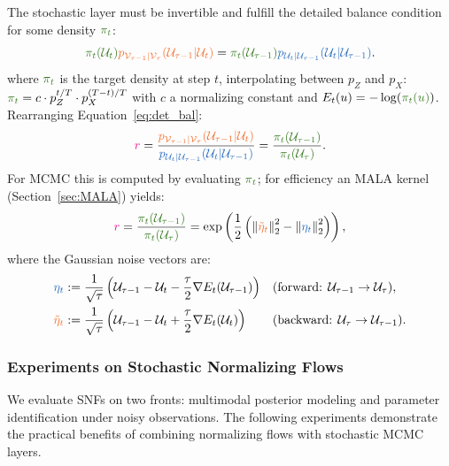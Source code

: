 The stochastic layer must be invertible and fulfill the detailed balance condition for some density $\textcolor{OliveGreen}{\pi_t}$:
\begin{equation}
    \label{eq:det_bal}
    \textcolor{OliveGreen}{\pi_t(\mathcal{U}_t)}\textcolor{Orange}{p_{\mathcal{V}_{\tau-1}|\mathcal{V}_\tau}(\mathcal{U}_{\tau-1}|\mathcal{U}_t)} = \textcolor{OliveGreen}{\pi_{t}(\mathcal{U}_{\tau-1})}\textcolor{NavyBlue}{p_{\mathcal{U}_t|\mathcal{U}_{\tau-1}}(\mathcal{U}_t|\mathcal{U}_{\tau-1})}.
\end{equation}
where $\textcolor{OliveGreen}{\pi_t}$ is the target density at step $t$, interpolating between $p_Z$ and $p_X$: $\textcolor{OliveGreen}{\pi_t} = c \cdot p_Z^{t/T} \cdot p_X^{(T-t)/T}$ with $c$ a normalizing constant and $E_t(u)=-\log(\textcolor{OliveGreen}{\pi_t(u)})$. Rearranging Equation~\ref{eq:det_bal}:
\begin{equation}
    \textcolor{Magenta}{r}=\frac{\textcolor{Orange}{p_{\mathcal{V}_{\tau-1}|\mathcal{V}_\tau}(\mathcal{U}_{\tau-1}|\mathcal{U}_t)}}{\textcolor{NavyBlue}{p_{\mathcal{U}_t|\mathcal{U}_{\tau-1}}(\mathcal{U}_t|\mathcal{U}_{\tau-1})}}=  \frac{\textcolor{OliveGreen}{\pi_t(\mathcal{U}_{\tau-1})}}{\textcolor{OliveGreen}{\pi_t(\mathcal{U}_{\tau})}}.
\end{equation}
For \ac{MCMC} this is computed by evaluating $\textcolor{OliveGreen}{\pi_t}$; for efficiency an \ac{MALA} kernel (Section~\ref{sec:MALA}) yields:
\begin{equation}
    \textcolor{Magenta}{r} = \frac{\textcolor{OliveGreen}{\pi_t(\mathcal{U}_{\tau-1})}}{\textcolor{OliveGreen}{\pi_t(\mathcal{U}_{\tau})}} = \exp\left(\frac{1}{2}\left(\left\|\textcolor{Orange}{\tilde{\eta}_t}\right\|^2_2-\left\|\textcolor{NavyBlue}{\eta_t}\right\|^2_2\right)\right),
\end{equation}
where the Gaussian noise vectors are:
\begin{align}
    \textcolor{NavyBlue}{\eta_t} &:= \frac{1}{\sqrt{\tau}} \left( \mathcal{U}_{\tau-1} - \mathcal{U}_t - \frac{\tau}{2} \nabla E_t(\mathcal{U}_{\tau-1}) \right) && \text{(forward: } \mathcal{U}_{\tau-1}\to \mathcal{U}_{\tau}\text{)}, \\
    \textcolor{Orange}{\tilde{\eta}_t} &:= \frac{1}{\sqrt{\tau}} \left( \mathcal{U}_{\tau-1} - \mathcal{U}_t + \frac{\tau}{2} \nabla E_t(\mathcal{U}_t) \right) && \text{(backward: } \mathcal{U}_{\tau}\to \mathcal{U}_{\tau-1}\text{)}.
\end{align}

\subsubsection{Experiments on Stochastic Normalizing Flows}
We evaluate \acp{SNF} on two fronts: multimodal posterior modeling and parameter identification under noisy observations. The following experiments demonstrate the practical benefits of combining normalizing flows with stochastic \ac{MCMC} layers.

